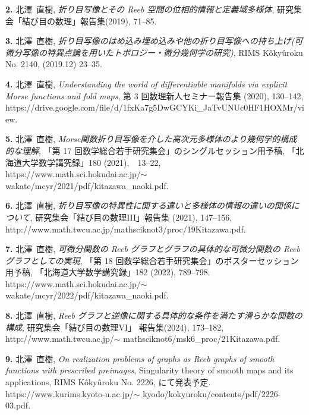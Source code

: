 \documentclass{article}
\begin{document}
\par\noindent
{\bf 2.} 北澤\ 直樹, \textsl{折り目写像とその Reeb 空間の位相的情報と定義域多様体}, 研究集会「結び目の数理」報告集(2019), 71--85.

\par\noindent
{\bf  3.} 北澤\ 直樹, \textsl{折り目写像のはめ込み埋め込みや他の折り目写像への持ち上げ{\rm (}可微分写像の特異点論を用いたトポロジー・微分幾何学の研究{)\rm }}, RIMS K\^{o}ky\^{u}roku No. 2140, (2019.12) 23--35.

\par\noindent
{\bf 4.} 北澤\ 直樹, \textsl{Understanding the world of differentiable manifolds via explicit Morse functions and fold maps}, 第 3 回数理新人セミナー報告集 (2020), 130--142, \\ https://drive.google.com/file/d/1fxKa7g5DwGCYKi\_JaTvUNUc0HF1HOXMr/view.

\par\noindent
{\bf 5.} 北澤\ 直樹, \textsl{{\rm Morse}関数折り目写像を介した高次元多様体のより幾何学的構成的な理解}, 「第 17 回数学総合若手研究集会」のシングルセッション用予稿, 「北海道大学数学講究録」180 (2021),　13--22, \\
https://www.math.sci.hokudai.ac.jp/$\sim$ wakate/mcyr/2021/pdf/kitazawa\_naoki.pdf.

\par\noindent
{\bf 6.} 北澤\ 直樹, \textsl{折り目写像の特異性に関する違いと多様体の情報の違いの関係について}, 
研究集会「結び目の数理III」報告集 (2021), 147--156, \\
http://www.math.twcu.ac.jp/mathsciknot3/proc/19Kitazawa.pdf.

\par\noindent
{\bf 7.} 北澤\ 直樹, \textsl{可微分関数の Reeb グラフとグラフの具体的な可微分関数の Reeb グラフとしての実現}, 「第 18 回数学総合若手研究集会」のポスターセッション用予稿, 「北海道大学数学講究録」182 (2022), 789--798. \\
https://www.math.sci.hokudai.ac.jp/$\sim$ wakate/mcyr/2022/pdf/kitazawa\_naoki.pdf.

\par\noindent
{\bf 8.} 北澤\ 直樹, \textsl{Reeb グラフと逆像に関する具体的な条件を満たす滑らかな関数の構成}, 研究集会「結び目の数理VI」 報告集(2024), 173--182, http://www.math.twcu.ac.jp/$\sim$ mathsciknot6/msk6\_proc/21Kitazawa.pdf.

\par\noindent
{\bf 9.} 北澤\ 直樹, \textsl{On realization problems of graphs as Reeb graphs of smooth functions with prescribed preimages}, Singularity theory of smooth maps and its applications, RIMS K\^{o}ky\^{u}roku No. 2226, にて発表予定.
\\
https://www.kurims.kyoto-u.ac.jp/$\sim$ kyodo/kokyuroku/contents/pdf/2226-03.pdf.\\
\ \\
\end{document}
